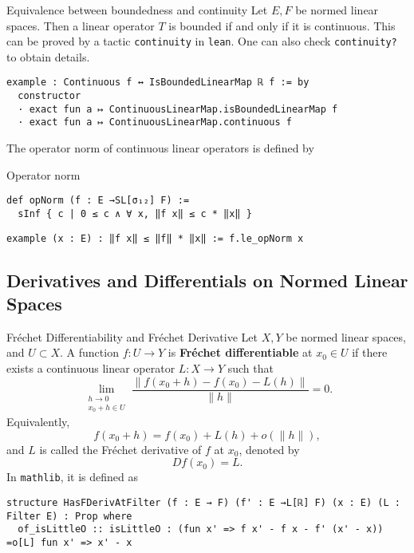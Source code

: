 \documentclass[a4paper]{article}
\begin{document}
\begin{thm}{Equivalence between boundedness and continuity} 
Let \(E, F\) be normed linear spaces. Then a linear operator \(T\) is bounded if and only if it is continuous. This can be proved by a tactic \texttt{continuity} in \texttt{lean}. One can also check \texttt{continuity?} to obtain details.
\begin{lstlisting}[style = lean]
example : Continuous f ↔ IsBoundedLinearMap ℝ f := by
  constructor
  · exact fun a ↦ ContinuousLinearMap.isBoundedLinearMap f
  · exact fun a ↦ ContinuousLinearMap.continuous f
\end{lstlisting}
\end{thm}
The operator norm of continuous linear operators is defined by
\begin{dfn}{Operator norm}
\begin{lstlisting}[style = lean]
def opNorm (f : E →SL[σ₁₂] F) :=
  sInf { c | 0 ≤ c ∧ ∀ x, ‖f x‖ ≤ c * ‖x‖ }
\end{lstlisting}
\begin{lstlisting}[style = lean]
example (x : E) : ‖f x‖ ≤ ‖f‖ * ‖x‖ := f.le_opNorm x
\end{lstlisting}
\end{dfn}



\subsection{Derivatives and Differentials on Normed Linear Spaces}

\begin{dfn}{Fréchet Differentiability and Fréchet Derivative}  
Let \(X, Y\) be normed linear spaces, and \(U \subset X\). A function \(f : U \to Y\) is \textbf{Fréchet differentiable} at \(x_0 \in U\) if there exists a continuous linear operator \(L : X \to Y\) such that 
\begin{equation}
\label{eq:def_F_diff}
    \lim_{\substack{h \to 0 \\ x_0 + h \in U}} \frac{\| f(x_0 + h) - f(x_0) - L(h) \|}{\| h \|} = 0.
\end{equation}
Equivalently,  
\[
f(x_0 + h) = f(x_0) + L(h) + o(\|h\|),
\]  
and \(L\) is called the Fréchet derivative of \(f\) at \(x_0\), denoted by  
\[
Df(x_0) = L.
\]
In \texttt{mathlib}, it is defined as
\begin{lstlisting}[style = lean]
structure HasFDerivAtFilter (f : E → F) (f' : E →L[ℝ] F) (x : E) (L : Filter E) : Prop where
  of_isLittleO :: isLittleO : (fun x' => f x' - f x - f' (x' - x)) =o[L] fun x' => x' - x
\end{lstlisting}
\end{dfn}
\end{document}
